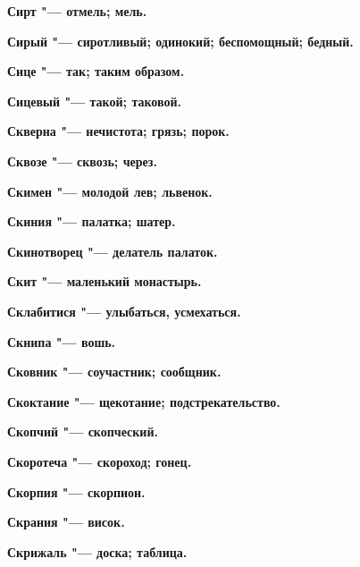 \bfseries Сирт \normalfont{} "--- отмель; мель. 




\bfseries Сирый \normalfont{} "--- сиротливый; одинокий; беспомощный; бедный. 




\bfseries Сице \normalfont{} "--- так; таким образом. 




\bfseries Сицевый \normalfont{} "--- такой; таковой. 




\bfseries Скверна \normalfont{} "--- нечистота; грязь; порок. 




\bfseries Сквозе \normalfont{} "--- сквозь; через. 




\bfseries Скимен \normalfont{} "--- молодой лев; львенок. 




\bfseries Скиния \normalfont{} "--- палатка; шатер. 




\bfseries Скинотворец \normalfont{} "--- делатель палаток. 




\bfseries Скит \normalfont{} "--- маленький монастырь. 




\bfseries Склабитися \normalfont{} "--- улыбаться, усмехаться. 




\bfseries Скнипа \normalfont{} "--- вошь. 




\bfseries Сковник \normalfont{} "--- соучастник; сообщник. 




\bfseries Скоктание \normalfont{} "--- щекотание; подстрекательство. 




\bfseries Скопчий \normalfont{} "--- скопческий. 




\bfseries Скоротеча \normalfont{} "--- скороход; гонец. 




\bfseries Скорпия \normalfont{} "--- скорпион. 




\bfseries Скрания \normalfont{} "--- висок. 




\bfseries Скрижаль \normalfont{} "--- доска; таблица. 




